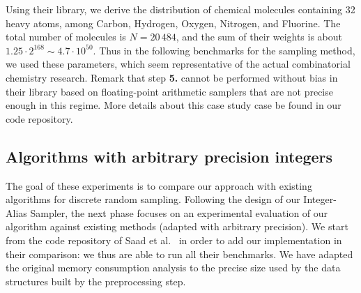 Using their library, we derive the distribution of chemical molecules containing 32 heavy atoms, among Carbon, Hydrogen, Oxygen, Nitrogen, and Fluorine. The total number of molecules is $N = 20\,484$, and the sum of their weights is about $1.25 \cdot 2^{168} \sim 4.7 \cdot 10^{50}$. Thus in the following benchmarks for the sampling method, we used these parameters, which seem representative of the actual combinatorial chemistry research. Remark that step \textbf{5.} cannot be performed without bias in their library based on floating-point arithmetic samplers that are not precise enough in this regime. More details about this case study case be found in our code repository.


\subsection{Algorithms with arbitrary precision integers}


The goal of these experiments is to compare our approach with existing algorithms for discrete random sampling.
Following the design of our Integer-Alias Sampler, the next phase focuses on an experimental evaluation of our algorithm against existing methods (adapted with arbitrary precision). We start from the code repository of Saad et al.~\cite{SFRM19} in order to add our implementation in their comparison: we thus are able to run all their benchmarks. We have adapted the original memory consumption analysis to the precise size used by the data structures built by the preprocessing step.


